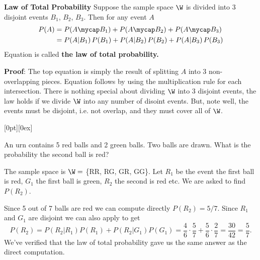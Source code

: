 \textbf{Law of Total Probability}
Suppose the sample space $\W$ is divided into 3 disjoint events
$B_1$, $B_2$, $B_3$. Then for any event $A$
\begin{align}
P(A) &= P(A\mycap B_1) + P(A\mycap B_2) + P(A\mycap B_3) \nonumber\\
&= P(A|B_1)\,P(B_1) + P(A|B_2)\,P(B_2) + P(A|B_3)\,P(B_3)\label{totprob}
\end{align}
Equation  is called \textbf{the law of total probability.}

\bigskip

\parbox{5in}{
\textbf{Proof}:  
The top equation is simply the result of splitting $A$ into 3 non-overlapping
pieces. Equation  follows by using
the multiplication rule for each intersection.
There is nothing special about dividing $\W$ into 3 disjoint events,
the law holds if we divide $\W$ into any number of disoint events.
But, note well, the events must be disjoint, i.e. not overlap, and 
they must cover all of $\W$.
}
\raisebox{-11ex}[0pt][0ex]{
\def\sc{2.2cm}
}

\bigskip

 An urn contains 5 red balls and 2 green balls. Two balls are drawn.
What is the probability the second ball is red?

\ans The sample space is $\W = $ \{RR, RG, GR, GG\}.
Let $R_1$ be the event the first ball is red, $G_1$ the first ball is 
green, $R_2$ the second is red etc. We are asked to find $P(R_2)$.

\cont

Since 5 out of 7 balls are red we can compute directly $P(R_2) = 5/7$.
Since $R_1$ and $G_1$ are disjoint we can also apply 
to get 
\[P(R_2) = P(R_2|R_1)P(R_1) + P(R_2|G_1)P(G_1) = 
\frac46\cdot\frac57 + \frac56\cdot\frac27 = \frac{30}{42} = \frac57.
\]
We've verified that 
the law of total probability gave us the same answer as the direct computation.

\medskip

